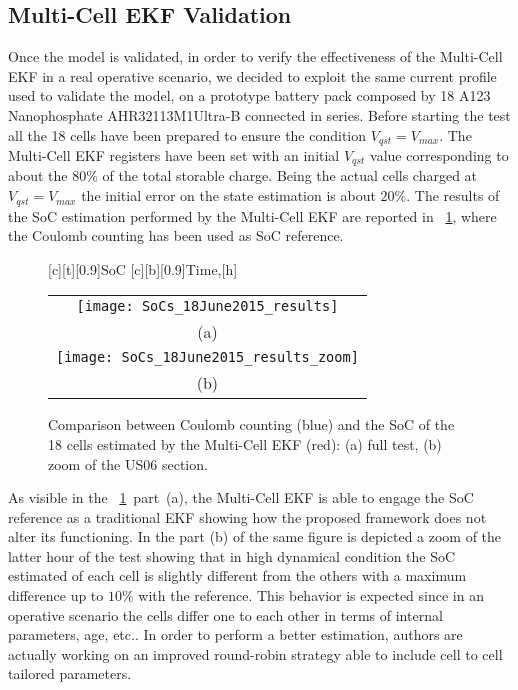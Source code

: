 \documentclass[journal]{IEEEtran}
\begin{document}
\subsection{Multi-Cell EKF Validation}
Once the model is validated, in order to verify the effectiveness of the Multi-Cell EKF in a real operative scenario, we decided to exploit the same current profile used to validate the model, on a prototype battery pack composed by 18 A123 Nanophosphate AHR32113M1Ultra-B connected in series. Before starting the test all the 18 cells have been prepared to ensure the condition $V_{qst}=V_{max}$.
The Multi-Cell EKF registers have been set with an initial $V_{qst}$ value corresponding to about the $80\%$ of the total storable charge. Being the actual cells charged at $V_{qst}=V_{max}$ the initial error on the state estimation is about $20\%$.
The results of the SoC estimation performed by the Multi-Cell EKF are reported in \figurename~\ref{fig::soc_initial_100_parallel}, where the Coulomb counting has been used as SoC reference.
\begin{figure}[htbph]
\centering
{}[c][t][0.9]{\scriptsize{SoC}}
[c][b][0.9]{\scriptsize{Time,[h]}}
\begin{tabular}{c}
\texttt{[image: SoCs\_18June2015\_results]} \\ 
(a)\\
\texttt{[image: SoCs\_18June2015\_results\_zoom]} \\
(b)\\
\end{tabular}
\caption{Comparison between Coulomb counting (blue) and the SoC of the 18 cells estimated by the Multi-Cell EKF (red): (a) full test, (b) zoom of the US06 section.}
\label{fig::soc_initial_100_parallel}    
\end{figure}
As visible in the \figurename~\ref{fig::soc_initial_100_parallel}~part~(a), the Multi-Cell EKF is able to engage the SoC reference as a traditional EKF showing how the proposed framework does not alter its functioning. In the part (b) of the same figure is depicted a zoom of the latter hour of the test showing that in high dynamical condition the SoC estimated of each cell is slightly different from the others with a maximum difference up to $10\%$ with the reference.
This behavior is expected since in an operative scenario the cells differ one to each other in terms of internal parameters, age, etc..
In order to perform a better estimation, authors are actually working on an improved round-robin strategy able to include cell to cell tailored parameters. 
\end{document}
